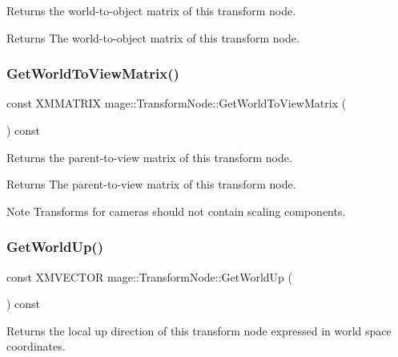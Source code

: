 Returns the world-\/to-\/object matrix of this transform node.

\begin{DoxyReturn}{Returns}
The world-\/to-\/object matrix of this transform node. 
\end{DoxyReturn}
\hypertarget{classmage_1_1_transform_node_a79572d99dea625ee4e05247c0f645ba9}{}\label{classmage_1_1_transform_node_a79572d99dea625ee4e05247c0f645ba9} 
\subsubsection{\texorpdfstring{Get\+World\+To\+View\+Matrix()}{GetWorldToViewMatrix()}}
{\footnotesize\ttfamily const X\+M\+M\+A\+T\+R\+IX mage\+::\+Transform\+Node\+::\+Get\+World\+To\+View\+Matrix (\begin{DoxyParamCaption}{ }\end{DoxyParamCaption}) const}

Returns the parent-\/to-\/view matrix of this transform node.

\begin{DoxyReturn}{Returns}
The parent-\/to-\/view matrix of this transform node. 
\end{DoxyReturn}
\begin{DoxyNote}{Note}
Transforms for cameras should not contain scaling components. 
\end{DoxyNote}
\hypertarget{classmage_1_1_transform_node_a05d878f235e94b1814b24a790d738ba6}{}\label{classmage_1_1_transform_node_a05d878f235e94b1814b24a790d738ba6} 
\subsubsection{\texorpdfstring{Get\+World\+Up()}{GetWorldUp()}}
{\footnotesize\ttfamily const X\+M\+V\+E\+C\+T\+OR mage\+::\+Transform\+Node\+::\+Get\+World\+Up (\begin{DoxyParamCaption}{ }\end{DoxyParamCaption}) const}

Returns the local up direction of this transform node expressed in world space coordinates.

